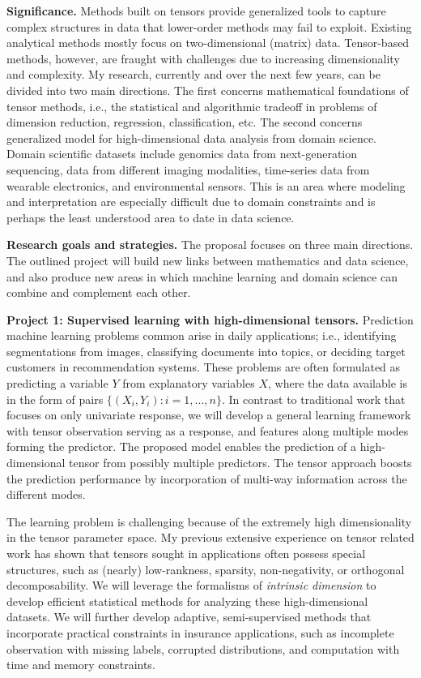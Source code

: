 \documentclass[11pt]{article}
\theoremstyle{plain}
\theoremstyle{definition}
\begin{document}
{\bf Significance.} Methods built on tensors provide generalized tools to capture complex structures in data that lower-order methods may fail to exploit. Existing analytical methods mostly focus on two-dimensional (matrix) data. Tensor-based methods, however, are fraught with challenges due to increasing dimensionality and complexity. My research, currently and over the next few years, can be divided into two main directions. The first concerns mathematical foundations of tensor methods, i.e., the statistical and algorithmic tradeoff in problems of dimension reduction, regression, classification, etc. The second concerns generalized model for high-dimensional data analysis from domain science. Domain scientific datasets include genomics data from next-generation sequencing, data from different imaging modalities, time-series data from wearable electronics, and environmental sensors. This is an area where modeling and interpretation are especially difficult due to domain constraints and is perhaps the least understood area to date in data science.

{\bf Research goals and strategies.} The proposal focuses on three main directions. The outlined project will build new links between mathematics and data science, and also produce new areas in which machine learning and domain science can combine and complement each other.

{\bf Project 1: Supervised learning with high-dimensional tensors.} Prediction machine learning problems common arise in daily applications; i.e., identifying segmentations from images, classifying documents into topics, or deciding target customers in recommendation systems. These problems are often formulated as predicting a variable $Y$ from explanatory variables $X$, where the data available is in the form of pairs $\{(X_i , Y_i )\colon i = 1, . . . , n\}$. In contrast to traditional work that focuses on only univariate response, we will develop a general learning framework with tensor observation serving as a response, and features along multiple modes forming the predictor. The proposed model enables the prediction of a high-dimensional tensor from possibly multiple predictors. The tensor approach boosts the prediction performance by incorporation of multi-way information across the different modes.

The learning problem is challenging because of the extremely high dimensionality in the tensor parameter space. My previous extensive experience on tensor related work has shown that tensors sought in applications often possess special structures, such as (nearly) low-rankness, sparsity, non-negativity, or orthogonal decomposability. We will leverage the formalisms of \emph{intrinsic dimension} to develop efficient statistical methods for analyzing these high-dimensional datasets. We will further develop adaptive, semi-supervised methods that incorporate practical constraints in insurance applications, such as incomplete observation with missing labels, corrupted distributions, and computation with time and memory constraints.
\end{document}
